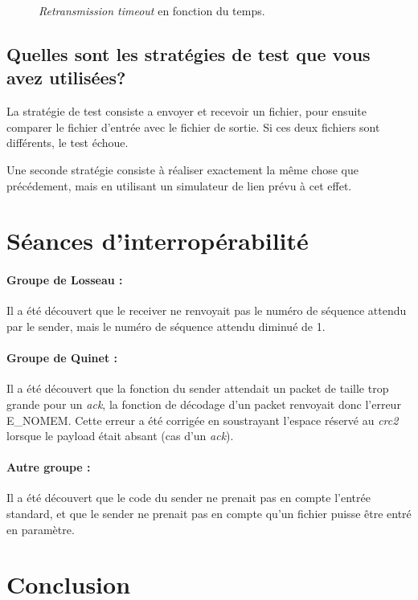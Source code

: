\documentclass[10pt,a4paper]{article}
\begin{document}
\begin{figure}[!h]
\centering
{}

\caption{\textit{Retransmission timeout} en fonction du temps.}
\label{fig:perf3}
\end{figure}

\subsection{Quelles sont les stratégies de test que vous avez utilisées?}
La stratégie de test consiste a envoyer et recevoir un fichier, pour ensuite comparer le fichier d'entrée avec le fichier de sortie. Si ces deux fichiers sont différents, le test échoue.

Une seconde stratégie consiste à réaliser exactement la même chose que précédement, mais en utilisant un simulateur de lien prévu à cet effet.

\section{Séances d'interropérabilité}

\paragraph{Groupe de Losseau :} Il a été découvert que le receiver ne renvoyait pas le numéro de séquence attendu par le sender, mais le numéro de séquence attendu diminué de 1.

\paragraph{Groupe de Quinet : } Il a été découvert que la fonction du sender attendait un packet de taille trop grande pour un \textit{ack}, la fonction de décodage d'un packet renvoyait donc l'erreur E\_NOMEM. Cette erreur a été corrigée en soustrayant l'espace réservé au \textit{crc2} lorsque le payload était absant (cas d'un \textit{ack}).

\paragraph{Autre groupe : } Il a été découvert que le code du sender ne prenait pas en compte l'entrée standard, et que le sender ne prenait pas en compte qu'un fichier puisse être entré en paramètre.

\section{Conclusion}
\end{document}
